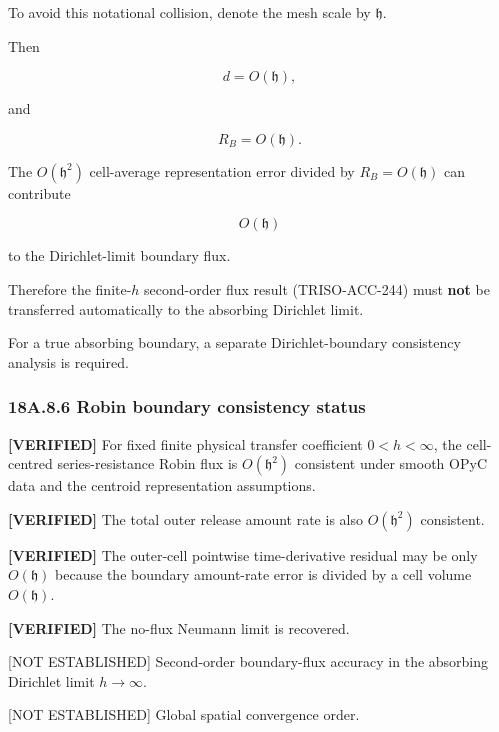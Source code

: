 \documentclass[11pt,a4paper]{article}
\begin{document}
To avoid this notational collision, denote the mesh scale by $\mathfrak h$.

Then

\begin{equation}
d=O(\mathfrak h),
\tag{TRISO-ACC-260}
\label{eq:triso-acc-260}
\end{equation}

and

\begin{equation}
R_B=O(\mathfrak h).
\tag{TRISO-ACC-261}
\label{eq:triso-acc-261}
\end{equation}

The $O(\mathfrak h^2)$ cell-average representation error divided by $R_B=O(\mathfrak h)$ can contribute

\begin{equation}
O(\mathfrak h)
\tag{TRISO-ACC-262}
\label{eq:triso-acc-262}
\end{equation}

to the Dirichlet-limit boundary flux.

Therefore the finite-$h$ second-order flux result (TRISO-ACC-244) must \textbf{not} be transferred automatically to the absorbing Dirichlet limit.

For a true absorbing boundary, a separate Dirichlet-boundary consistency analysis is required.

\subsubsection*{18A.8.6 Robin boundary consistency status}

\textbf{[VERIFIED]} For fixed finite physical transfer coefficient $0<h<\infty$, the cell-centred series-resistance Robin flux is $O(\mathfrak h^2)$ consistent under smooth OPyC data and the centroid representation assumptions.

\textbf{[VERIFIED]} The total outer release amount rate is also $O(\mathfrak h^2)$ consistent.

\textbf{[VERIFIED]} The outer-cell pointwise time-derivative residual may be only $O(\mathfrak h)$ because the boundary amount-rate error is divided by a cell volume $O(\mathfrak h)$.

\textbf{[VERIFIED]} The no-flux Neumann limit is recovered.

[NOT ESTABLISHED] Second-order boundary-flux accuracy in the absorbing Dirichlet limit $h\to\infty$.

[NOT ESTABLISHED] Global spatial convergence order.
\end{document}
